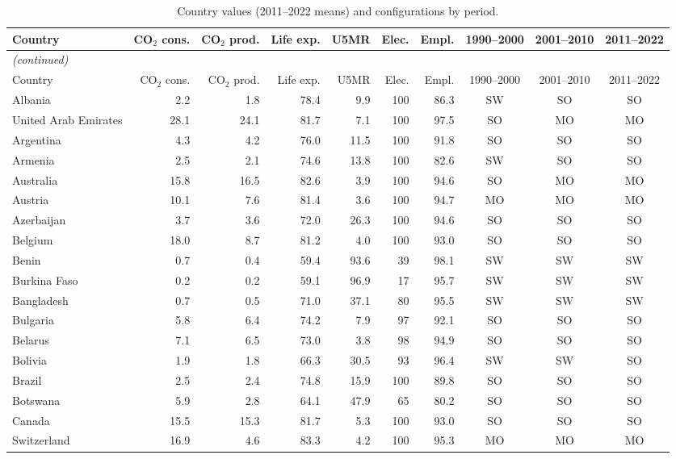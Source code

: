 \begingroup
\footnotesize
\setlength{\tabcolsep}{4pt}
\begin{longtable}{@{}lrrrrrrccc@{}}
\caption{Country values (2011--2022 means) and configurations by period.}\label{tab:countries}\\
\toprule
Country & CO$_2$ cons. & CO$_2$ prod. & Life exp. & U5MR & Elec. & Empl. & 1990--2000 & 2001--2010 & 2011--2022 \\
\midrule
\endfirsthead
\multicolumn{10}{l}{\textit{(continued)}}\\
\toprule
Country & CO$_2$ cons. & CO$_2$ prod. & Life exp. & U5MR & Elec. & Empl. & 1990--2000 & 2001--2010 & 2011--2022 \\
\midrule
\endhead
\bottomrule
\endfoot
\bottomrule
\endlastfoot
Albania & 2.2 & 1.8 & 78.4 & 9.9 & 100 & 86.3 & SW & SO & SO \\
United Arab Emirates & 28.1 & 24.1 & 81.7 & 7.1 & 100 & 97.5 & SO & MO & MO \\
Argentina & 4.3 & 4.2 & 76.0 & 11.5 & 100 & 91.8 & SO & SO & SO \\
Armenia & 2.5 & 2.1 & 74.6 & 13.8 & 100 & 82.6 & SW & SO & SO \\
Australia & 15.8 & 16.5 & 82.6 & 3.9 & 100 & 94.6 & SO & MO & MO \\
Austria & 10.1 & 7.6 & 81.4 & 3.6 & 100 & 94.7 & MO & MO & MO \\
Azerbaijan & 3.7 & 3.6 & 72.0 & 26.3 & 100 & 94.6 & SO & SO & SO \\
Belgium & 18.0 & 8.7 & 81.2 & 4.0 & 100 & 93.0 & SO & SO & SO \\
Benin & 0.7 & 0.4 & 59.4 & 93.6 & 39 & 98.1 & SW & SW & SW \\
Burkina Faso & 0.2 & 0.2 & 59.1 & 96.9 & 17 & 95.7 & SW & SW & SW \\
Bangladesh & 0.7 & 0.5 & 71.0 & 37.1 & 80 & 95.5 & SW & SW & SW \\
Bulgaria & 5.8 & 6.4 & 74.2 & 7.9 & 97 & 92.1 & SO & SO & SO \\
Belarus & 7.1 & 6.5 & 73.0 & 3.8 & 98 & 94.9 & SO & SO & SO \\
Bolivia & 1.9 & 1.8 & 66.3 & 30.5 & 93 & 96.4 & SW & SW & SO \\
Brazil & 2.5 & 2.4 & 74.8 & 15.9 & 100 & 89.8 & SO & SO & SO \\
Botswana & 5.9 & 2.8 & 64.1 & 47.9 & 65 & 80.2 & SO & SO & SO \\
Canada & 15.5 & 15.3 & 81.7 & 5.3 & 100 & 93.0 & SO & SO & SO \\
Switzerland & 16.9 & 4.6 & 83.3 & 4.2 & 100 & 95.3 & MO & MO & MO \\

\end{longtable}
